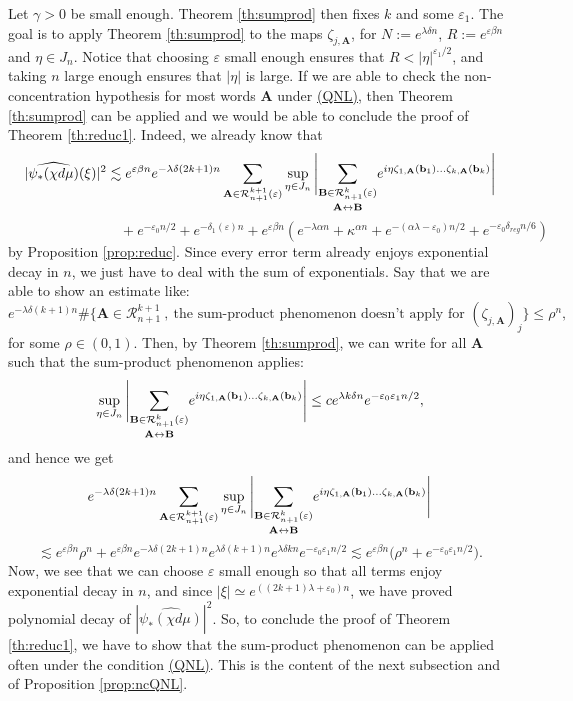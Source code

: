 \documentclass[a4paper]{article}
\theoremstyle{definition}
\begin{document}
Let $\gamma>0$ be small enough. Theorem \ref{th:sumprod} then fixes $k$ and some $\varepsilon_1$.
The goal is to apply Theorem \ref{th:sumprod} to the maps $\zeta_{j,\mathbf{A}}$, for $N := e^{\lambda \delta n}$, $R:=e^{\varepsilon \beta n}$ and $\eta \in J_n$. Notice that choosing $\varepsilon$ small enough ensures that $R<|\eta|^{\varepsilon_1/2}$, and taking $n$ large enough ensures that $|\eta|$ is large. 
If we are able to check the non-concentration hypothesis for most words $\mathbf{A}$ under \hyperref[QNL]{(QNL)}, then Theorem \ref{th:sumprod} can be applied and we would be able to conclude the proof of Theorem \ref{th:reduc1}.
Indeed, we already know that
$$ |\widehat{\psi_*(\chi d\mu)}(\xi)|^2 \lesssim e^{ \varepsilon \beta n} e^{-\lambda \delta (2k+1) n} \sum_{\mathbf{A} \in \mathcal{R}_{n+1}^{k+1}(\varepsilon)} \sup_{\eta \in J_n} \Bigg{|} \underset{\mathbf{A} \leftrightarrow \mathbf{B}}{\sum_{\mathbf{B} \in \mathcal{R}_{n+1}^k(\varepsilon)}} e^{i \eta \zeta_{1,\mathbf{A}}(\mathbf{b}_1) \dots \zeta_{k,\mathbf{A}}(\mathbf{b}_k) } \Bigg| $$
$$ \quad \quad  \quad \quad  \quad \quad  \quad \quad + e^{- \varepsilon_0 n/2} +  e^{-\delta_1(\varepsilon) n} + e^{\varepsilon \beta n} \left( e^{- \lambda \alpha n} +  \kappa^{\alpha n} + e^{-(\alpha \lambda-\varepsilon_0)n/2} +  e^{- \varepsilon_0 \delta_{reg}n/6} \right) $$
by Proposition \ref{prop:reduc}. Since every error term already enjoys exponential decay in $n$, we just have to deal with the sum of exponentials. Say that we are able to show an estimate like:
$$ e^{- \lambda \delta (k+1) n} \# \{ \mathbf{A} \in \mathcal{R}_{n+1}^{k+1} \ , \ \text{the sum-product phenomenon doesn't apply for } (\zeta_{j,\mathbf{A}})_j\} \leq \rho^n, $$
for some $\rho \in (0,1)$. Then, by Theorem \ref{th:sumprod}, we can write for all $\mathbf{A}$ such that the sum-product phenomenon applies:
$$ \sup_{\eta \in J_n} \Bigg{|} \underset{\mathbf{A} \leftrightarrow \mathbf{B}}{\sum_{\mathbf{B} \in \mathcal{R}_{n+1}^k(\varepsilon)}} e^{i \eta \zeta_{1,\mathbf{A}}(\mathbf{b}_1) \dots \zeta_{k,\mathbf{A}}(\mathbf{b}_k) } \Bigg| \leq c e^{\lambda k \delta n} e^{- \varepsilon_0 \varepsilon_1 n/2 } ,$$
and hence we get
$$ e^{-\lambda \delta (2k+1) n} \sum_{\mathbf{A} \in \mathcal{R}_{n+1}^{k+1}(\varepsilon)} \sup_{\eta \in J_n} \Bigg{|} \underset{\mathbf{A} \leftrightarrow \mathbf{B}}{\sum_{\mathbf{B} \in \mathcal{R}_{n+1}^k(\varepsilon)}} e^{ i  \eta \zeta_{1,\mathbf{A}}(\mathbf{b}_1) \dots \zeta_{k,\mathbf{A}}(\mathbf{b}_k)} \Bigg| $$ $$ \lesssim  e^{ \varepsilon \beta n} \rho^n + e^{\varepsilon \beta n} e^{-\lambda \delta  (2k+1) n} e^{\lambda \delta (k+1) n} e^{\lambda \delta k n} e^{- \varepsilon_0 \varepsilon_1 n/2} \lesssim  e^{\varepsilon \beta n} \Big(\rho^n + e^{-\varepsilon_0 \varepsilon_1 n/2} \Big) .$$
Now, we see that we can choose $\varepsilon$ small enough so that all terms enjoy exponential decay in $n$, and since $ |\xi| \simeq e^{\left( (2k+1) \lambda + \varepsilon_0 \right) n} $, we have proved polynomial decay of $|\widehat{\psi_* (\chi d\mu)}|^2$. So, to conclude the proof of Theorem \ref{th:reduc1}, we have to show that the sum-product phenomenon can be applied often under the condition \hyperref[QNL]{(QNL)}. This is the content of the next subsection and of Proposition \ref{prop:ncQNL}.
\end{document}
